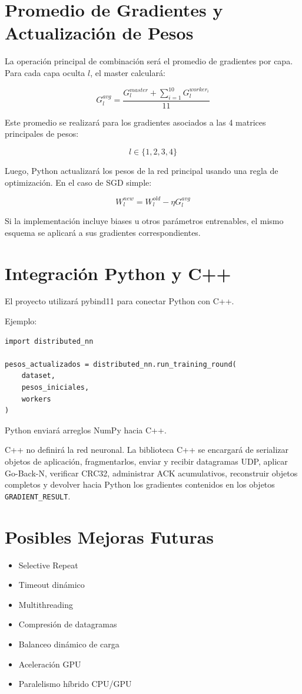 \documentclass[12pt]{article}
\begin{document}
\section{Promedio de Gradientes y Actualización de Pesos}

La operación principal de combinación será el promedio de gradientes por capa. Para cada capa oculta $l$, el master calculará:

\[
G_l^{avg} =
\frac{
G_l^{master} + \sum_{i=1}^{10} G_l^{worker_i}
}{11}
\]

Este promedio se realizará para los gradientes asociados a las 4 matrices principales de pesos:

\[
l \in \{1, 2, 3, 4\}
\]

Luego, Python actualizará los pesos de la red principal usando una regla de optimización. En el caso de SGD simple:

\[
W_l^{new} = W_l^{old} - \eta G_l^{avg}
\]

Si la implementación incluye biases u otros parámetros entrenables, el mismo esquema se aplicará a sus gradientes correspondientes.

\section{Integración Python y C++}

El proyecto utilizará pybind11 para conectar Python con C++.

Ejemplo:

\begin{verbatim}
import distributed_nn

pesos_actualizados = distributed_nn.run_training_round(
    dataset,
    pesos_iniciales,
    workers
)
\end{verbatim}

Python enviará arreglos NumPy hacia C++.

C++ no definirá la red neuronal. La biblioteca C++ se encargará de serializar objetos de aplicación, fragmentarlos, enviar y recibir datagramas UDP, aplicar Go-Back-N, verificar CRC32, administrar ACK acumulativos, reconstruir objetos completos y devolver hacia Python los gradientes contenidos en los objetos \texttt{GRADIENT\_RESULT}.

\section{Posibles Mejoras Futuras}

\begin{itemize}
\item Selective Repeat
\item Timeout dinámico
\item Multithreading
\item Compresión de datagramas
\item Balanceo dinámico de carga
\item Aceleración GPU
\item Paralelismo híbrido CPU/GPU
\end{itemize}
\end{document}
